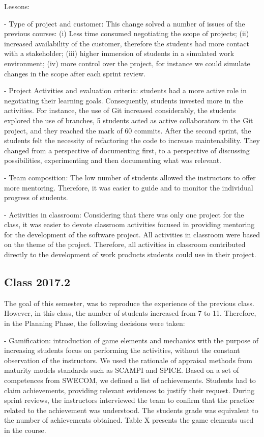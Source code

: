 Lessons:

-	Type of project and customer: This change solved a number of issues of the previous courses: (i) Less time consumed negotiating the scope of projects; (ii) increased availability of the customer, therefore the students had more contact with a stakeholder; (iii) higher immersion of students in a simulated work environment; (iv) more control over the project, for instance we could simulate changes in the scope after each sprint review.

-	Project Activities and evaluation criteria: students had a more active role in negotiating their learning goals. Consequently, students invested more in the activities. For instance, the use of Git increased considerably, the students explored the use of branches, 5 students acted as active collaborators in the Git project, and they reached the mark of 60 commits. After the second sprint, the students felt the necessity of refactoring the code to increase maintenability. They changed from a perspective of documenting first, to a perspective of discussing possibilities, experimenting and then documenting what was relevant.

-	Team composition: The low number of students allowed the instructors to offer more mentoring. Therefore, it was easier to guide and to monitor the individual  progress of students.

-	Activities in classroom: Considering that there was only one project for the class, it was easier to devote classroom activities focused in providing mentoring for the development of the software project. All activities in classroom were based on the theme of the project. Therefore, all activities in classroom contributed directly to the development of work products students could use in their project. 

\subsection{Class 2017.2}

The goal of this semester, was to reproduce the experience of the previous class. However, in this class, the number of students increased from 7 to 11. Therefore, in the Planning Phase, the following decisions were taken:

-	Gamification: introduction of game elements and mechanics with the purpose of increasing students focus on performing the activities, without the constant observation of the instructors. We used the rationale of appraisal methods from maturity models standards such as SCAMPI and SPICE. Based on a set of competences from SWECOM, we defined a list of achievements. Students had to claim achievements, providing relevant evidences to justify their request. During sprint reviews, the instructors interviewed the team to confirm that the practice related to the achievement was understood. The students grade was equivalent to the number of achievements obtained. Table X presents the game elements used in the course.

